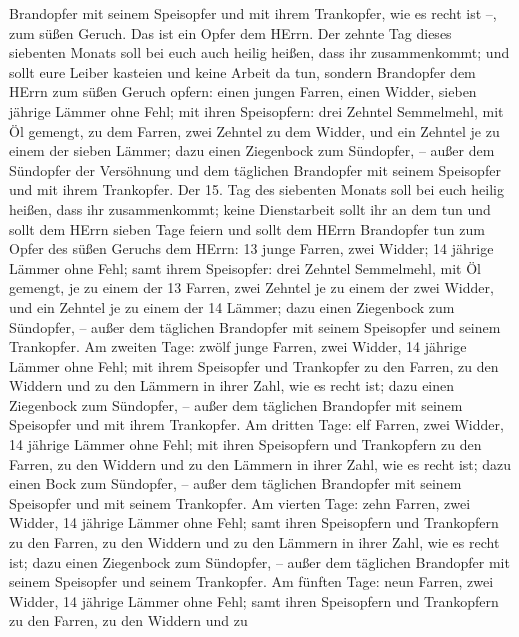 Brandopfer mit seinem Speisopfer und mit ihrem Trankopfer, wie es recht
ist --, zum süßen Geruch. Das ist ein Opfer dem HErrn.  Der
zehnte Tag dieses siebenten Monats soll bei euch auch heilig heißen,
dass ihr zusammenkommt; und sollt eure Leiber kasteien und keine Arbeit
da tun,  sondern Brandopfer dem HErrn zum süßen Geruch
opfern: einen jungen Farren, einen Widder, sieben jährige Lämmer ohne
Fehl;  mit ihren Speisopfern: drei Zehntel Semmelmehl, mit
Öl gemengt, zu dem Farren, zwei Zehntel zu dem Widder,  und
ein Zehntel je zu einem der sieben Lämmer;  dazu einen
Ziegenbock zum Sündopfer, -- außer dem Sündopfer der Versöhnung und dem
täglichen Brandopfer mit seinem Speisopfer und mit ihrem Trankopfer.
 Der 15. Tag des siebenten Monats soll bei euch heilig
heißen, dass ihr zusammenkommt; keine Dienstarbeit sollt ihr an dem tun
und sollt dem HErrn sieben Tage feiern  und sollt dem HErrn
Brandopfer tun zum Opfer des süßen Geruchs dem HErrn: 13 junge Farren,
zwei Widder; 14 jährige Lämmer ohne Fehl;  samt ihrem
Speisopfer: drei Zehntel Semmelmehl, mit Öl gemengt, je zu einem der 13
Farren, zwei Zehntel je zu einem der zwei Widder,  und ein
Zehntel je zu einem der 14 Lämmer;  dazu einen Ziegenbock
zum Sündopfer, -- außer dem täglichen Brandopfer mit seinem Speisopfer
und seinem Trankopfer.  Am zweiten Tage: zwölf junge
Farren, zwei Widder, 14 jährige Lämmer ohne Fehl;  mit
ihrem Speisopfer und Trankopfer zu den Farren, zu den Widdern und zu den
Lämmern in ihrer Zahl, wie es recht ist;  dazu einen
Ziegenbock zum Sündopfer, -- außer dem täglichen Brandopfer mit seinem
Speisopfer und mit ihrem Trankopfer.  Am dritten Tage: elf
Farren, zwei Widder, 14 jährige Lämmer ohne Fehl;  mit
ihren Speisopfern und Trankopfern zu den Farren, zu den Widdern und zu
den Lämmern in ihrer Zahl, wie es recht ist;  dazu einen
Bock zum Sündopfer, -- außer dem täglichen Brandopfer mit seinem
Speisopfer und mit seinem Trankopfer.  Am vierten Tage:
zehn Farren, zwei Widder, 14 jährige Lämmer ohne Fehl; 
samt ihren Speisopfern und Trankopfern zu den Farren, zu den Widdern und
zu den Lämmern in ihrer Zahl, wie es recht ist;  dazu einen
Ziegenbock zum Sündopfer, -- außer dem täglichen Brandopfer mit seinem
Speisopfer und seinem Trankopfer.  Am fünften Tage: neun
Farren, zwei Widder, 14 jährige Lämmer ohne Fehl;  samt
ihren Speisopfern und Trankopfern zu den Farren, zu den Widdern und zu
